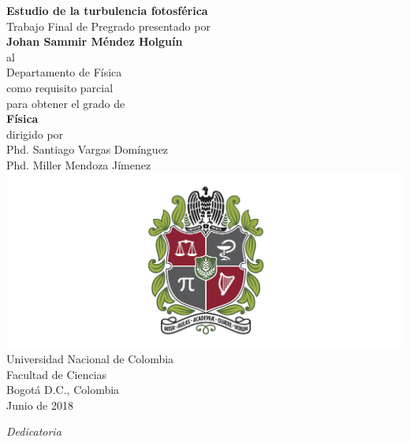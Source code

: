 \documentclass[12pt,letterpaper,oneside]{book}
\theoremstyle{plain}
\theoremstyle{definition}
\theoremstyle{remark}
\begin{document}
\thispagestyle{empty}
\label{Portada}
\begin{center}
\textbf{{\LARGE Estudio de la turbulencia fotosférica}}\\[2cm]

Trabajo Final de Pregrado presentado por\\[0.7cm]

\textbf{{\LARGE Johan Sammir Méndez Holguín}}\\[1cm]

al\\[4mm]

{\Large Departamento de Física}\\[1.5cm]

como requisito parcial\\
para obtener el grado de\\[1 cm]

\textbf{{\Large Física}}\\[1.5cm]

dirigido por\\
Phd. Santiago Vargas Domínguez\\
Phd. Miller Mendoza Jímenez\\[1cm]




\includegraphics[scale=.10]{escudo}\\
{\Large Universidad Nacional de Colombia}\\[2mm]
{\Large Facultad de Ciencias}\\[2mm]
Bogot\'a D.C., Colombia\\[2mm]
Junio de 2018

\end{center}

\newpage\null\thispagestyle{empty}\newpage

\newpage
{}
\thispagestyle{empty}
\vspace*{9cm}
\begin{flushright}
\textit{Dedicatoria\\ }
\end{flushright}
\end{document}
